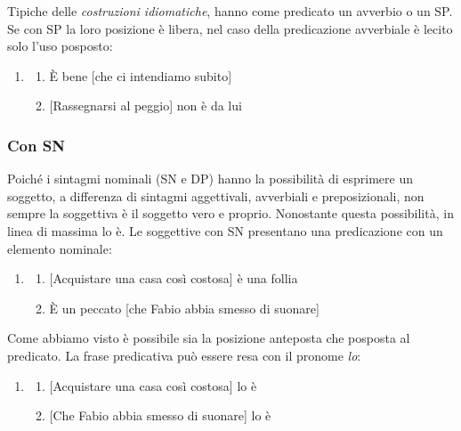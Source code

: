 \documentclass[
  a4paper,
  twoside,
  11pt,
  chapterprefix=false,
  bibliography=totocnumbered,
  listof=flat]{scrbook}
\providecommand{\tightlist}{%
  \setlength{\itemsep}{0pt}\setlength{\parskip}{0pt}}
\begin{document}
Tipiche delle \emph{costruzioni idiomatiche}, hanno come predicato un avverbio o un SP. Se con SP la loro posizione è libera, nel caso della predicazione avverbiale è lecito solo l'uso posposto:

\begin{enumerate}
\def\labelenumi{(\arabic{enumi})}
\setcounter{enumi}{33}
\item
  \begin{enumerate}
  \def\labelenumii{\alph{enumii}.}
  \tightlist
  \item
    È bene {[}che ci intendiamo subito{]}
  \item
    {[}Rassegnarsi al peggio{]} non è da lui
  \end{enumerate}
\end{enumerate}

\hypertarget{con-sn}{%
\subsubsection{Con SN}\label{con-sn}}

Poiché i sintagmi nominali (SN e DP) hanno la possibilità di esprimere un soggetto, a differenza di sintagmi aggettivali, avverbiali e preposizionali, non sempre la soggettiva è il soggetto vero e proprio. Nonostante questa possibilità, in linea di massima lo è. Le soggettive con SN presentano una predicazione con un elemento nominale:

\begin{enumerate}
\def\labelenumi{(\arabic{enumi})}
\setcounter{enumi}{34}
\item
  \begin{enumerate}
  \def\labelenumii{\alph{enumii}.}
  \tightlist
  \item
    {[}Acquistare una casa così costosa{]} è una follia
  \item
    È un peccato {[}che Fabio abbia smesso di suonare{]}
  \end{enumerate}
\end{enumerate}

Come abbiamo visto è possibile sia la posizione anteposta che posposta al predicato. La frase predicativa può essere resa con il pronome \emph{lo}:

\begin{enumerate}
\def\labelenumi{(\arabic{enumi})}
\setcounter{enumi}{35}
\item
  \begin{enumerate}
  \def\labelenumii{\alph{enumii}.}
  \tightlist
  \item
    {[}Acquistare una casa così costosa{]} lo è
  \item
    {[}Che Fabio abbia smesso di suonare{]} lo è
  \end{enumerate}
\end{enumerate}
\end{document}
